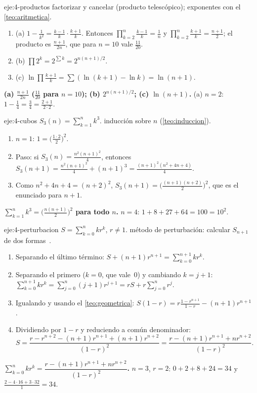 \begin{solucion}{eje:4-productos}
\planteamiento factorizar y cancelar (producto telescópico); exponentes con el \cref{teo:aritmetica}.
\pasos
\begin{enumerate}[label=\arabic*.]
  \item (a) $1-\frac1{k^2}=\frac{k-1}k\cdot\frac{k+1}k$. Entonces $\prod_{k=2}^n\frac{k-1}k=\frac1n$ y $\prod_{k=2}^n\frac{k+1}k=\frac{n+1}2$; el producto es $\frac{n+1}{2n}$, que para $n=10$ vale $\frac{11}{20}$.
  \item (b) $\prod2^k=2^{\sum k}=2^{n(n+1)/2}$.
  \item (c) $\ln\prod\frac{k+1}k=\sum(\ln(k+1)-\ln k)=\ln(n+1)$.
\end{enumerate}
\resultado \textbf{(a) $\frac{n+1}{2n}$ ($\frac{11}{20}$ para $n=10$); (b) $2^{n(n+1)/2}$; (c) $\ln(n+1)$.}
\comprobacion (a) $n=2$: $1-\frac14=\frac34=\frac{2+1}{2\cdot2}$.
\end{solucion}

\begin{solucion}{eje:4-cubos}
\datos $S_3(n)=\sum_{k=1}^nk^3$.
\planteamiento inducción sobre $n$ (\cref{teo:induccion}).
\pasos
\begin{enumerate}[label=\arabic*.]
  \item $n=1$: $1=\bigl(\frac{1\cdot2}2\bigr)^2$.
  \item Paso: si $S_3(n)=\frac{n^2(n+1)^2}4$, entonces $S_3(n+1)=\frac{n^2(n+1)^2}4+(n+1)^3=\frac{(n+1)^2(n^2+4n+4)}4$.
  \item Como $n^2+4n+4=(n+2)^2$, $S_3(n+1)=\bigl(\frac{(n+1)(n+2)}2\bigr)^2$, que es el enunciado para $n+1$.
\end{enumerate}
\resultado \textbf{$\sum_{k=1}^nk^3=\bigl(\frac{n(n+1)}2\bigr)^2$ para todo $n$.}
\comprobacion $n=4$: $1+8+27+64=100=10^2$.
\end{solucion}

\begin{solucion}{eje:4-perturbacion}
\datos $S=\sum_{k=0}^nkr^k$, $r\neq1$.
\planteamiento método de perturbación: calcular $S_{n+1}$ de dos formas~\cite[§2.3]{gkp}.
\pasos
\begin{enumerate}[label=\arabic*.]
  \item Separando el último término: $S+(n+1)r^{n+1}=\sum_{k=0}^{n+1}kr^k$.
  \item Separando el primero ($k=0$, que vale~0) y cambiando $k=j+1$: $\sum_{k=0}^{n+1}kr^k=\sum_{j=0}^n(j+1)r^{j+1}=rS+r\sum_{j=0}^nr^j$.
  \item Igualando y usando el \cref{teo:geometrica}: $S(1-r)=r\frac{1-r^{n+1}}{1-r}-(n+1)r^{n+1}$.
  \item Dividiendo por $1-r$ y reduciendo a común denominador:
  \[
  S=\frac{r-r^{n+2}-(n+1)r^{n+1}+(n+1)r^{n+2}}{(1-r)^2}=\frac{r-(n+1)r^{n+1}+nr^{n+2}}{(1-r)^2}.
  \]
\end{enumerate}
\resultado \textbf{$\sum_{k=0}^nkr^k=\dfrac{r-(n+1)r^{n+1}+nr^{n+2}}{(1-r)^2}$.}
\comprobacion $n=3$, $r=2$: $0+2+8+24=34$ y $\frac{2-4\cdot16+3\cdot32}{1}=34$.
\end{solucion}

